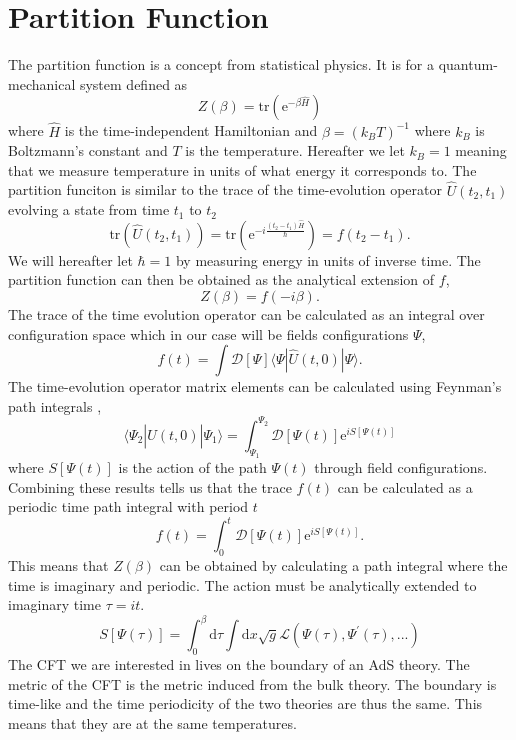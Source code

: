 \documentclass[12pt]{report}
\renewcommand{\d}{\ensuremath{\mathrm{d}}}
\newcommand{\e}{\ensuremath{\mathrm{e}}}
\renewcommand{\L}{\ensuremath{\mathcal{L}}}
\renewcommand{\i}{\ensuremath{i}}
\newcommand{\ket}[1]{|#1\rangle}
\newcommand{\bra}[1]{\langle#1|}
\newcommand{\bracket}[3]{\bra{#1}#2\ket{#3}}
\begin{document}
\section{Partition Function}
The partition function is a concept from statistical physics. It is for a quantum-mechanical system defined as
\begin{equation}
 Z(\beta)=\mathrm{tr}(\e^{-\beta\hat{H}})
\end{equation}
where $\hat{H}$ is the time-independent Hamiltonian and $\beta=(k_BT)^{-1}$ where $k_B$ is Boltzmann's constant and $T$ is the temperature. Hereafter we let $k_B=1$ meaning that we measure temperature in units of what energy it corresponds to. The partition funciton is similar to the trace of the time-evolution operator $\hat{U}(t_2,t_1)$ evolving a state from time $t_1$ to $t_2$
\begin{equation}
 \mathrm{tr}(\hat{U}(t_2,t_1))=\mathrm{tr}(\e^{-\i\frac{(t_2-t_1)\hat{H}}{\hbar}})=f(t_2-t_1).
\end{equation}
We will hereafter let $\hbar=1$ by measuring energy in units of inverse time. The partition function can then be obtained as the analytical extension of $f$,
\begin{equation}
 Z(\beta)=f(-\i\beta).
\end{equation}
The trace of the time evolution operator can be calculated as an integral over configuration space which in our case will be fields configurations $\Psi$,
\begin{equation}
 f(t)=\int \mathcal{D}[\Psi] \bracket{\Psi}{\hat{U}(t,0)}{\Psi}.
\end{equation}
The time-evolution operator matrix elements can be calculated using Feynman's path integrals \cite{feynman1965quantum},
\begin{equation}
 \bracket{\Psi_2}{\hat{U}(t,0)}{\Psi_1}=\int_{\Psi_1}^{\Psi_2} \mathcal{D}[\Psi(t)]\e^{\i S[\Psi(t)]}
\end{equation}
where $S[\Psi(t)]$ is the action of the path $\Psi(t)$ through field configurations. Combining these results tells us that the trace $f(t)$ can be calculated as a periodic time path integral with period $t$
\begin{equation}
 f(t)=\int_0^t \mathcal{D}[\Psi(t)]\e^{\i S[\Psi(t)]}.
\end{equation}
This means that $Z(\beta)$ can be obtained by calculating a path integral where the time is imaginary and periodic. The action must be analytically extended to imaginary time $\tau=\i t$.
\begin{equation}
 S[\Psi(\tau)]=\int_0^\beta\d \tau\int\d x\sqrt{g} \L(\Psi(\tau),\Psi^\prime(\tau),...)
\end{equation}
The CFT we are interested in lives on the boundary of an AdS theory. The metric of the CFT is the metric induced from the bulk theory. The boundary is time-like and the time periodicity of the two theories are thus the same. This means that they are at the same temperatures.\\
\end{document}
